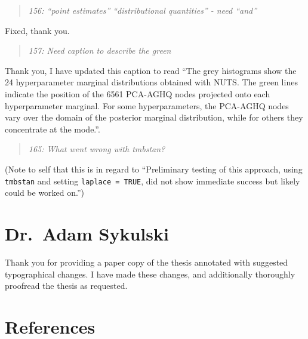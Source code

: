 \documentclass[
  12pt,
]{article}
\begin{document}
\begin{quote}
\emph{156: ``point estimates'' ``distributional quantities'' - need
``and''}
\end{quote}

Fixed, thank you.

\begin{quote}
\emph{157: Need caption to describe the green}
\end{quote}

Thank you, I have updated this caption to read ``The grey histograms
show the 24 hyperparameter marginal distributions obtained with NUTS.
The green lines indicate the position of the 6561 PCA-AGHQ nodes
projected onto each hyperparameter marginal. For some hyperparameters,
the PCA-AGHQ nodes vary over the domain of the posterior marginal
distribution, while for others they concentrate at the mode.''.

\begin{quote}
\emph{165: What went wrong with tmbstan?}
\end{quote}

(Note to self that this is in regard to ``Preliminary testing of this
approach, using \texttt{tmbstan} and setting \texttt{laplace\ =\ TRUE},
did not show immediate success but likely could be worked on.'')

\newpage

\section{Dr.~Adam Sykulski}\label{dr.-adam-sykulski}

Thank you for providing a paper copy of the thesis annotated with
suggested typographical changes. I have made these changes, and
additionally thoroughly proofread the thesis as requested.

\newpage

\section*{References}\label{references}
\end{document}
